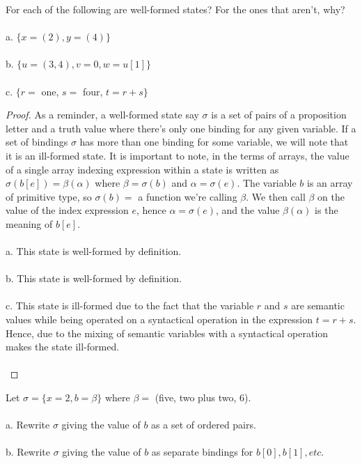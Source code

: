 \documentclass[12pt]{article}
\newenvironment{exercise}[2][Exercise]{\begin{trivlist}
\item[\hskip \labelsep {\bfseries #1}\hskip \labelsep {\bfseries #2.}]}{\end{trivlist}}
\begin{document}
\begin{exercise}{2}
For each of the following are well-formed states? For the ones that aren't, why? \\ \\
a. $\{ x = (2), y = (4)\}$ \\ \\
b. $\{ u = (3,4), v = 0, w = u[1]\}$ \\ \\
c. $\{r =$ one, $s =$ four, $t = r + s\}$
\end{exercise}
 
\begin{proof}
As a reminder, a well-formed state say $\sigma$ is a set of pairs of a proposition letter and a truth value where there's only one binding for any given variable. If a set of bindings $\sigma$ has more than one binding for some variable, we will note that it is an ill-formed state. It is important to note, in the terms of arrays, the value of a single array indexing expression within a state is written as $\sigma(b[e]) = \beta(\alpha)$ where $\beta = \sigma(b)$ and $\alpha = \sigma(e)$. The variable $b$ is an array of primitive type, so $\sigma(b) = $ a function we're calling $\beta$. We then call $\beta$ on the value of the index expression $e$, hence $\alpha = \sigma(e)$, and the value $\beta(\alpha)$ is the meaning of $b[e]$. \\ \\
a. This state is well-formed by definition. \\ \\ 
b. This state is well-formed by definition. \\ \\ 
c. This state is ill-formed due to the fact that the variable $r$ and $s$ are semantic values while being operated on a syntactical operation in the expression $t = r + s$. Hence, due to the mixing of semantic variables with a syntactical operation makes the state ill-formed. \\ \\
\end{proof}

\begin{exercise}{3}
Let $\sigma = \{ x = 2, b = \beta \}$ where $\beta =$ (five, two plus two, 6). \\ \\ 
a. Rewrite $\sigma$ giving the value of $b$ as a set of ordered pairs. \\ \\
b. Rewrite $\sigma$ giving the value of $b$ as separate bindings for $b[0], b[1], etc.$ 
\end{exercise}
\end{document}

